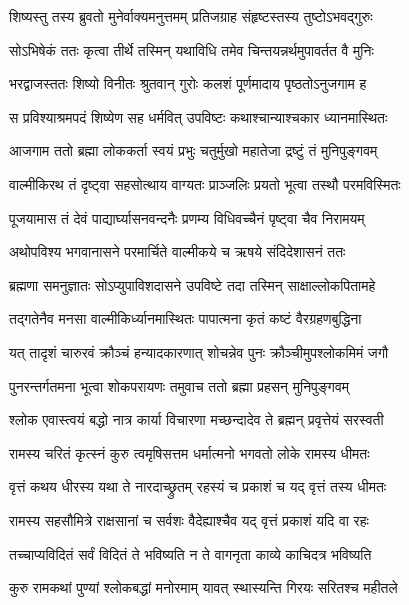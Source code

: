 \twolineshloka
{शिष्यस्तु तस्य ब्रुवतो मुनेर्वाक्यमनुत्तमम्}
{प्रतिजग्राह संहृष्टस्तस्य तुष्टोऽभवद्गुरुः} %

\twolineshloka
{सोऽभिषेकं ततः कृत्वा तीर्थे तस्मिन् यथाविधि}
{तमेव चिन्तयन्नर्थमुपावर्तत वै मुनिः} %

\twolineshloka
{भरद्वाजस्ततः शिष्यो विनीतः श्रुतवान् गुरोः}
{कलशं पूर्णमादाय पृष्ठतोऽनुजगाम ह} %

\twolineshloka
{स प्रविश्याश्रमपदं शिष्येण सह धर्मवित्}
{उपविष्टः कथाश्चान्याश्चकार ध्यानमास्थितः} %

\twolineshloka
{आजगाम ततो ब्रह्मा लोककर्ता स्वयं प्रभुः}
{चतुर्मुखो महातेजा द्रष्टुं तं मुनिपुङ्गवम्} %

\twolineshloka
{वाल्मीकिरथ तं दृष्ट्वा सहसोत्थाय वाग्यतः}
{प्राञ्जलिः प्रयतो भूत्वा तस्थौ परमविस्मितः} %

\twolineshloka
{पूजयामास तं देवं पाद्यार्घ्यासनवन्दनैः}
{प्रणम्य विधिवच्चैनं पृष्ट्वा चैव निरामयम्} %

\twolineshloka
{अथोपविश्य भगवानासने परमार्चिते}
{वाल्मीकये च ऋषये संदिदेशासनं ततः} %

\twolineshloka
{ब्रह्मणा समनुज्ञातः सोऽप्युपाविशदासने}
{उपविष्टे तदा तस्मिन् साक्षाल्लोकपितामहे} %

\twolineshloka
{तद्गतेनैव मनसा वाल्मीकिर्ध्यानमास्थितः}
{पापात्मना कृतं कष्टं वैरग्रहणबुद्धिना} %

\twolineshloka
{यत् तादृशं चारुरवं क्रौञ्चं हन्यादकारणात्}
{शोचन्नेव पुनः क्रौञ्चीमुपश्लोकमिमं जगौ} %

\twolineshloka
{पुनरन्तर्गतमना भूत्वा शोकपरायणः}
{तमुवाच ततो ब्रह्मा प्रहसन् मुनिपुङ्गवम्} %

\twolineshloka
{श्लोक एवास्त्वयं बद्धो नात्र कार्या विचारणा}
{मच्छन्दादेव ते ब्रह्मन् प्रवृत्तेयं सरस्वती} %

\twolineshloka
{रामस्य चरितं कृत्स्नं कुरु त्वमृषिसत्तम}
{धर्मात्मनो भगवतो लोके रामस्य धीमतः} %

\twolineshloka
{वृत्तं कथय धीरस्य यथा ते नारदाच्छ्रुतम्}
{रहस्यं च प्रकाशं च यद् वृत्तं तस्य धीमतः} %

\twolineshloka
{रामस्य सहसौमित्रे राक्षसानां च सर्वशः}
{वैदेह्याश्चैव यद् वृत्तं प्रकाशं यदि वा रहः} %

\twolineshloka
{तच्चाप्यविदितं सर्वं विदितं ते भविष्यति}
{न ते वागनृता काव्ये काचिदत्र भविष्यति} %

\twolineshloka
{कुरु रामकथां पुण्यां श्लोकबद्धां मनोरमाम्}
{यावत् स्थास्यन्ति गिरयः सरितश्च महीतले} %

